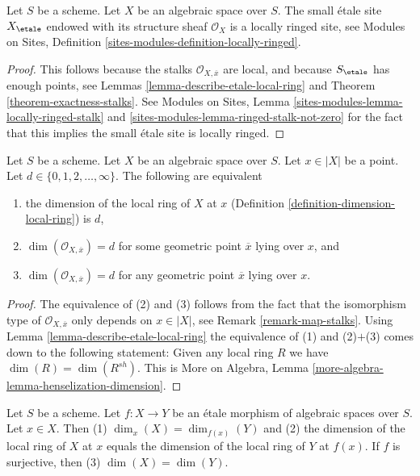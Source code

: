 \begin{lemma}
\label{lemma-etale-site-locally-ringed}
Let $S$ be a scheme.
Let $X$ be an algebraic space over $S$.
The small \'etale site $X_\etale$ endowed with its
structure sheaf $\mathcal{O}_X$ is a locally ringed site, see
Modules on Sites, Definition \ref{sites-modules-definition-locally-ringed}.
\end{lemma}

\begin{proof}
This follows because the stalks
$\mathcal{O}_{X, \overline{x}}$ are
local, and because $S_\etale$ has enough points, see
Lemmas \ref{lemma-describe-etale-local-ring} and
Theorem \ref{theorem-exactness-stalks}.
See
Modules on Sites, Lemma \ref{sites-modules-lemma-locally-ringed-stalk} and
\ref{sites-modules-lemma-ringed-stalk-not-zero}
for the fact that this implies the small \'etale site is locally ringed.
\end{proof}

\begin{lemma}
\label{lemma-dimension-local-ring}
Let $S$ be a scheme. Let $X$ be an algebraic space over $S$.
Let $x \in |X|$ be a point. Let $d \in \{0, 1, 2, \ldots, \infty\}$.
The following are equivalent
\begin{enumerate}
\item the dimension of the local ring of $X$ at $x$
(Definition \ref{definition-dimension-local-ring}) is $d$,
\item $\dim(\mathcal{O}_{X, \overline{x}}) = d$ for some geometric
point $\overline{x}$ lying over $x$, and
\item $\dim(\mathcal{O}_{X, \overline{x}}) = d$ for any geometric
point $\overline{x}$ lying over $x$.
\end{enumerate}
\end{lemma}

\begin{proof}
The equivalence of (2) and (3) follows from the fact that the
isomorphism type of $\mathcal{O}_{X, \overline{x}}$ only depends
on $x \in |X|$, see Remark \ref{remark-map-stalks}.
Using Lemma \ref{lemma-describe-etale-local-ring}
the equivalence of (1) and (2)$+$(3) comes down to the
following statement: Given any local ring $R$ we have
$\dim(R) = \dim(R^{sh})$. This is
More on Algebra, Lemma \ref{more-algebra-lemma-henselization-dimension}.
\end{proof}

\begin{lemma}
\label{lemma-dimension-decent-invariant-under-etale}
Let $S$ be a scheme. Let $f : X \to Y$ be an \'etale morphism
of algebraic spaces over $S$. Let $x \in X$. Then
(1) $\dim_x(X) = \dim_{f(x)}(Y)$ and (2) the dimension of
the local ring of $X$ at $x$ equals the dimension of
the local ring of $Y$ at $f(x)$. If $f$ is surjective, then
(3) $\dim(X) = \dim(Y)$.
\end{lemma}


